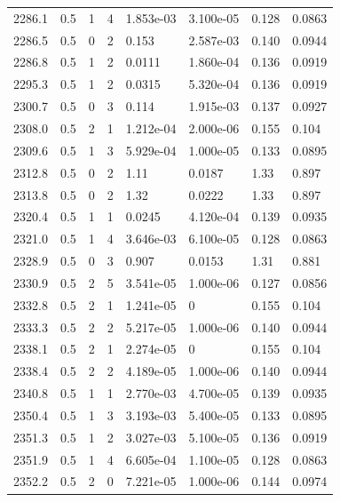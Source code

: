 \documentclass[preview]{standalone}
\begin{document}
{{{{{{{{{\begin{tabular}{L{1.2cm}C{1.2cm} C{0.3cm}C{0.5cm} C{1.4cm}C{1.4cm} C{1.4cm}C{1.4cm}}
  2286.1  &   0.5  & 1     &  4 &  1.853e-03  & 3.100e-05  & 0.128 &  0.0863   \\ 
  2286.5  &   0.5  & 0     &  2 &  0.153  & 2.587e-03  & 0.140 &  0.0944   \\ 
  2286.8  &   0.5  & 1     &  2 &  0.0111  & 1.860e-04  & 0.136 &  0.0919   \\ 
  2295.3  &   0.5  & 1     &  2 &  0.0315  & 5.320e-04  & 0.136 &  0.0919   \\ 
  2300.7  &   0.5  & 0     &  3 &  0.114  & 1.915e-03  & 0.137 &  0.0927   \\ 
  2308.0  &   0.5  & 2     &  1 &  1.212e-04  & 2.000e-06  & 0.155 &  0.104   \\ 
  2309.6  &   0.5  & 1     &  3 &  5.929e-04  & 1.000e-05  & 0.133 &  0.0895   \\ 
  2312.8  &   0.5  & 0     &  2 &  1.11  & 0.0187  & 1.33 &  0.897   \\ 
  2313.8  &   0.5  & 0     &  2 &  1.32  & 0.0222  & 1.33 &  0.897   \\ 
  2320.4  &   0.5  & 1     &  1 &  0.0245  & 4.120e-04  & 0.139 &  0.0935   \\ 
  2321.0  &   0.5  & 1     &  4 &  3.646e-03  & 6.100e-05  & 0.128 &  0.0863   \\ 
  2328.9  &   0.5  & 0     &  3 &  0.907  & 0.0153  & 1.31 &  0.881   \\ 
  2330.9  &   0.5  & 2     &  5 &  3.541e-05  & 1.000e-06  & 0.127 &  0.0856   \\ 
  2332.8  &   0.5  & 2     &  1 &  1.241e-05  & 0  & 0.155 &  0.104   \\ 
  2333.3  &   0.5  & 2     &  2 &  5.217e-05  & 1.000e-06  & 0.140 &  0.0944   \\ 
  2338.1  &   0.5  & 2     &  1 &  2.274e-05  & 0  & 0.155 &  0.104   \\ 
  2338.4  &   0.5  & 2     &  2 &  4.189e-05  & 1.000e-06  & 0.140 &  0.0944   \\ 
  2340.8  &   0.5  & 1     &  1 &  2.770e-03  & 4.700e-05  & 0.139 &  0.0935   \\ 
  2350.4  &   0.5  & 1     &  3 &  3.193e-03  & 5.400e-05  & 0.133 &  0.0895   \\ 
  2351.3  &   0.5  & 1     &  2 &  3.027e-03  & 5.100e-05  & 0.136 &  0.0919   \\ 
  2351.9  &   0.5  & 1     &  4 &  6.605e-04  & 1.100e-05  & 0.128 &  0.0863   \\ 
  2352.2  &   0.5  & 2     &  0 &  7.221e-05  & 1.000e-06  & 0.144 &  0.0974   \\ 

\end{tabular}}}}}}}}}}
\end{document}
